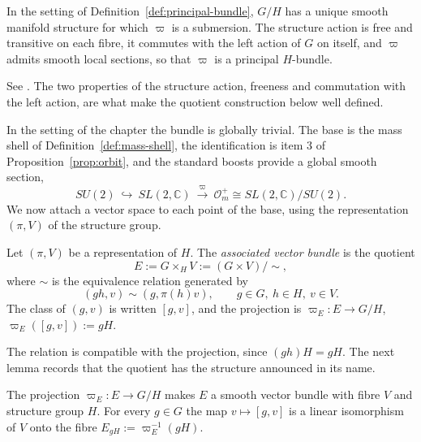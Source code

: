 	\begin{proposition}\label{prop:principal-bundle}
		In the setting of Definition~\ref{def:principal-bundle}, $G/H$ has a unique smooth manifold structure for which $\varpi$ is a submersion. The structure action is free and transitive on each fibre, it commutes with the left action of $G$ on itself, and $\varpi$ admits smooth local sections, so that $\varpi$ is a principal $H$-bundle.
	\end{proposition}
	
	\noindent See \cite[TODO-location]{TODO-Lee13}. The two properties of the structure action, freeness and commutation with the left action, are what make the quotient construction below well defined.
	
	In the setting of the chapter the bundle is globally trivial. The base is the mass shell of Definition~\ref{def:mass-shell}, the identification is item 3 of Proposition~\ref{prop:orbit}, and the standard boosts provide a global smooth section,
	\begin{equation}\label{eq:principal-dirac}
		SU(2)\ \hookrightarrow\ SL(2,\mathbb{C})\ \xrightarrow{\ \varpi\ }\ \mathcal{O}_m^+\cong SL(2,\mathbb{C})/SU(2).
	\end{equation}
	We now attach a vector space to each point of the base, using the representation $(\pi,V)$ of the structure group.
	
	\begin{definition}\label{def:associated-bundle}
		Let $(\pi,V)$ be a representation of $H$. The \emph{associated vector bundle} is the quotient
		\begin{equation}\label{eq:associated-bundle}
			E:=G\times_H V:=(G\times V)/\!\sim,
		\end{equation}
		where $\sim$ is the equivalence relation generated by
		\begin{equation}\label{eq:associated-equivalence}
			(gh,v)\sim(g,\pi(h)v),\qquad g\in G,\ h\in H,\ v\in V.
		\end{equation}
		The class of $(g,v)$ is written $[g,v]$, and the projection is $\varpi_E:E\to G/H$, $\varpi_E([g,v]):=gH$.
	\end{definition}
	
	The relation is compatible with the projection, since $(gh)H=gH$. The next lemma records that the quotient has the structure announced in its name.
	
	\begin{lemma}\label{lem:associated-vector-bundle}
		The projection $\varpi_E:E\to G/H$ makes $E$ a smooth vector bundle with fibre $V$ and structure group $H$. For every $g\in G$ the map $v\mapsto[g,v]$ is a linear isomorphism of $V$ onto the fibre $E_{gH}:=\varpi_E^{-1}(gH)$.
	\end{lemma}
	
